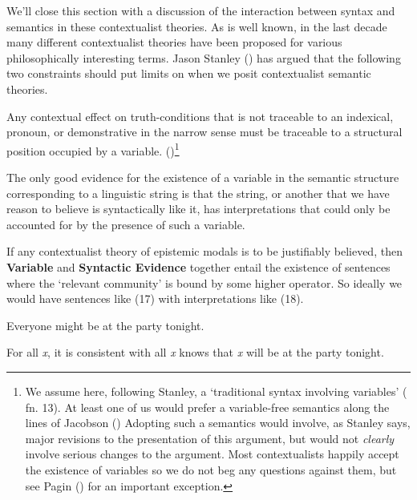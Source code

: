 \documentclass[
  11pt,
  letterpaper,
  DIV=11,
  numbers=noendperiod,
  twoside]{scrartcl}
\providecommand{\tightlist}{%
  \setlength{\itemsep}{0pt}\setlength{\parskip}{0pt}}
\begin{document}
We'll close this section with a discussion of the interaction between
syntax and semantics in these contextualist theories. As is well known,
in the last decade many different contextualist theories have been
proposed for various philosophically interesting terms. Jason Stanley
() has argued that the following
two constraints should put limits on when we posit contextualist
semantic theories.

\begin{description}
\tightlist
\item[Variable]
Any contextual effect on truth-conditions that is not traceable to an
indexical, pronoun, or demonstrative in the narrow sense must be
traceable to a structural position occupied by a variable.
()\footnote{We
  assume here, following Stanley, a `traditional syntax involving
  variables' ( fn. 13).
  At least one of us would prefer a variable-free semantics along the
  lines of Jacobson () Adopting such a
  semantics would involve, as Stanley says, major revisions to the
  presentation of this argument, but would not \emph{clearly} involve
  serious changes to the argument. Most contextualists happily accept
  the existence of variables so we do not beg any questions against
  them, but see Pagin () for an important
  exception.}
\end{description}

\begin{description}
\tightlist
\item[Syntactic Evidence]
The only good evidence for the existence of a variable in the semantic
structure corresponding to a linguistic string is that the string, or
another that we have reason to believe is syntactically like it, has
interpretations that could only be accounted for by the presence of such
a variable.
\end{description}

If any contextualist theory of epistemic modals is to be justifiably
believed, then \textbf{Variable} and \textbf{Syntactic Evidence}
together entail the existence of sentences where the `relevant
community' is bound by some higher operator. So ideally we would have
sentences like (17) with interpretations like (18).

\begin{description}
\tightlist
\item[(17)]
Everyone might be at the party tonight.
\item[(18)]
For all \emph{x}, it is consistent with all \emph{x} knows that \emph{x}
will be at the party tonight.
\end{description}
\end{document}
